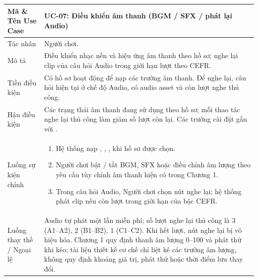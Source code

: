 \begin{xltabular}{\textwidth}{|L{3.3cm}|Y|}
\textbf{Mã \& Tên Use Case} & \textbf{UC-07: Điều khiển âm thanh (BGM / SFX / phát lại Audio)} \\ \hline
Tác nhân & Người chơi. \\ \hline
Mô tả & Điều khiển nhạc nền và hiệu ứng âm thanh theo hồ sơ; nghe lại clip của câu hỏi Audio trong giới hạn lượt theo CEFR. \\ \hline
Tiền điều kiện & Có hồ sơ hoạt động để nạp các trường âm thanh. Để nghe lại, câu hỏi hiện tại ở chế độ Audio, có audio asset và còn lượt nghe thủ công. \\ \hline
Hậu điều kiện & Các trạng thái âm thanh đang sử dụng theo hồ sơ; mỗi thao tác nghe lại thủ công làm giảm số lượt còn lại. Các trường cài đặt gắn với . \\ \hline
Luồng sự kiện chính &
\begin{enumerate}[nosep,leftmargin=*]
    \item Hệ thống nạp , , ,  khi hồ sơ được chọn.
    \item Người chơi bật / tắt BGM, SFX hoặc điều chỉnh âm lượng theo yêu cầu tùy chỉnh âm thanh hiện có trong Chương 1.
    \item Trong câu hỏi Audio, Người chơi chọn nút nghe lại; hệ thống phát clip nếu còn lượt trong giới hạn của bậc CEFR.
\end{enumerate} \\ \hline
Luồng thay thế / Ngoại lệ & Audio tự phát một lần miễn phí; số lượt nghe lại thủ công là 3 (A1--A2), 2 (B1--B2), 1 (C1--C2). Khi hết lượt, nút nghe lại bị vô hiệu hóa. Chương 1 quy định thanh âm lượng 0--100 và phát thử khi kéo; tài liệu thiết kế cơ chế chỉ liệt kê các trường âm lượng, không quy định khoảng giá trị, phát thử hoặc thời điểm lưu thay đổi. \\ \hline


\end{xltabular}
